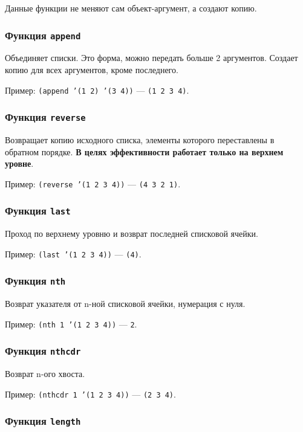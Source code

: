 Данные функции не меняют сам объект-аргумент, а создают копию.

\subsubsection{Функция \texttt{append}}

Объединяет списки. Это форма, можно передать больше 2 аргументов. Создает копию для всех аргументов, кроме последнего.

Пример: \texttt{(append '(1 2) '(3 4))} --- \texttt{(1 2 3 4)}.

\subsubsection{Функция \texttt{reverse}}

Возвращает копию исходного списка, элементы которого переставлены в обратном порядке. \textbf{В целях эффективности работает только на верхнем уровне}.

Пример: \texttt{(reverse '(1 2 3 4))} --- \texttt{(4 3 2 1)}.

\subsubsection{Функция \texttt{last}}

Проход по верхнему уровню и возврат последней списковой ячейки.

Пример: \texttt{(last '(1 2 3 4))} --- \texttt{(4)}.

\subsubsection{Функция \texttt{nth}}

Возврат указателя от n-ной списковой ячейки, нумерация с нуля.

Пример: \texttt{(nth 1 '(1 2 3 4))} --- \texttt{2}.

\subsubsection{Функция \texttt{nthcdr}}

Возврат n-ого хвоста.

Пример: \texttt{(nthcdr 1 '(1 2 3 4))} --- \texttt{(2 3 4)}.

\subsubsection{Функция \texttt{length}}

